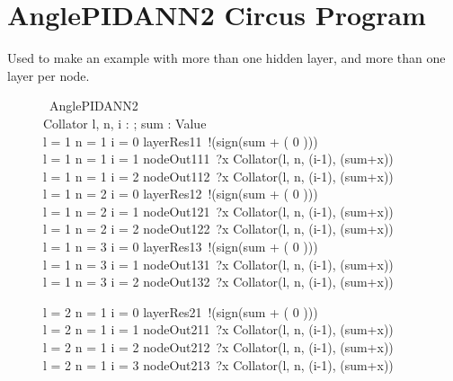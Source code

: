 \documentclass{article}
\begin{document}
\appendix 

\section{AnglePIDANN2 Circus Program}

Used to make an example with more than one hidden layer, and more than one layer per node. 

\begin{figure}[p] 
\begin{circus}
  \circprocess\ AnglePIDANN2 \circdef \ \circbegin \\%
      Collator \circdef l, n, i : \nat; sum : Value \circspot \\
      \lcircguard l = 1 \land n = 1 \land i = 0 \rcircguard \circguard layerRes11~!(sign(sum + ( 0 ))) \then \Skip \\%
      \extchoice
      \lcircguard l = 1 \land n = 1 \land i = 1 \rcircguard \circguard nodeOut111~?x  \then Collator(l, n, (i-1), (sum+x)) \\%
      \extchoice
      \lcircguard l = 1 \land n = 1 \land i = 2 \rcircguard \circguard nodeOut112~?x  \then Collator(l, n, (i-1), (sum+x)) \\%
      \extchoice
      \lcircguard l = 1 \land n = 2 \land i = 0 \rcircguard \circguard layerRes12~!(sign(sum + ( 0 ))) \then \Skip \\%
      \extchoice
      \lcircguard l = 1 \land n = 2 \land i = 1 \rcircguard \circguard nodeOut121~?x  \then Collator(l, n, (i-1), (sum+x)) \\%
      \extchoice
      \lcircguard l = 1 \land n = 2 \land i = 2 \rcircguard \circguard nodeOut122~?x  \then Collator(l, n, (i-1), (sum+x)) \\%
      \extchoice
      \lcircguard l = 1 \land n = 3 \land i = 0 \rcircguard \circguard layerRes13~!(sign(sum + ( 0 ))) \then \Skip \\%
      \extchoice
      \lcircguard l = 1 \land n = 3 \land i = 1 \rcircguard \circguard nodeOut131~?x  \then Collator(l, n, (i-1), (sum+x)) \\%
      \extchoice
      \lcircguard l = 1 \land n = 3 \land i = 2 \rcircguard \circguard nodeOut132~?x  \then Collator(l, n, (i-1), (sum+x)) \\%
      \extchoice
      
      
      \lcircguard l = 2 \land n = 1 \land i = 0 \rcircguard \circguard layerRes21~!(sign(sum + ( 0 ))) \then \Skip \\%
      \extchoice
      \lcircguard l = 2 \land n = 1 \land i = 1 \rcircguard \circguard nodeOut211~?x \then Collator(l, n, (i-1), (sum+x)) \\%
      \extchoice
      \lcircguard l = 2 \land n = 1 \land i = 2 \rcircguard \circguard nodeOut212~?x \then Collator(l, n, (i-1), (sum+x)) \\%
      \extchoice
      \lcircguard l = 2 \land n = 1 \land i = 3 \rcircguard \circguard nodeOut213~?x \then Collator(l, n, (i-1), (sum+x)) \\%
      \extchoice
      

\end{circus}
\end{figure}
\end{document}
